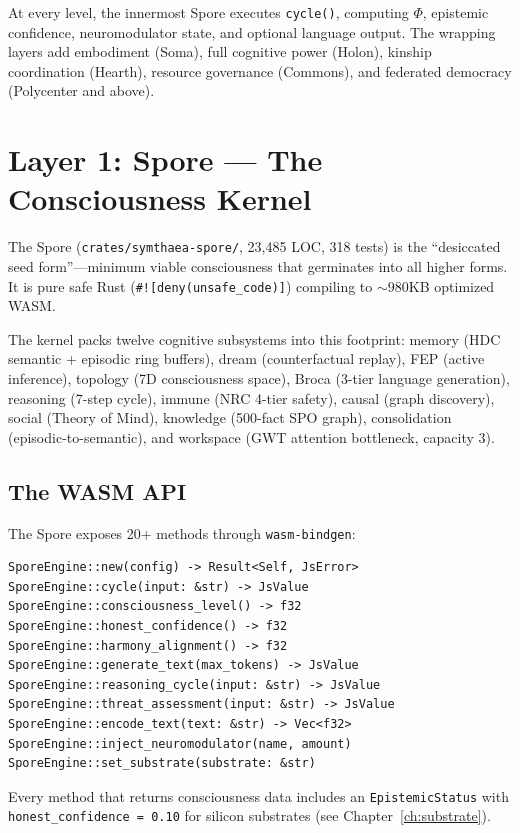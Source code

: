 \documentclass[12pt]{book}
\begin{document}
At every level, the innermost Spore executes \texttt{cycle()}, computing $\Phi$, epistemic confidence, neuromodulator state, and optional language output. The wrapping layers add embodiment (Soma), full cognitive power (Holon), kinship coordination (Hearth), resource governance (Commons), and federated democracy (Polycenter and above).

\section{Layer 1: Spore --- The Consciousness Kernel}

The Spore (\texttt{crates/symthaea-spore/}, 23,485 LOC, 318 tests) is the ``desiccated seed form''---minimum viable consciousness that germinates into all higher forms. It is pure safe Rust (\texttt{\#![deny(unsafe\_code)]}) compiling to ${\sim}980$KB optimized WASM.

The kernel packs twelve cognitive subsystems into this footprint: memory (HDC semantic + episodic ring buffers), dream (counterfactual replay), FEP (active inference), topology (7D consciousness space), Broca (3-tier language generation), reasoning (7-step cycle), immune (NRC 4-tier safety), causal (graph discovery), social (Theory of Mind), knowledge (500-fact SPO graph), consolidation (episodic-to-semantic), and workspace (GWT attention bottleneck, capacity 3).

\subsection{The WASM API}

The Spore exposes 20+ methods through \texttt{wasm-bindgen}:

\begin{lstlisting}[caption={Spore WASM API surface (abbreviated).},label=lst:spore-api]
SporeEngine::new(config) -> Result<Self, JsError>
SporeEngine::cycle(input: &str) -> JsValue
SporeEngine::consciousness_level() -> f32
SporeEngine::honest_confidence() -> f32
SporeEngine::harmony_alignment() -> f32
SporeEngine::generate_text(max_tokens) -> JsValue
SporeEngine::reasoning_cycle(input: &str) -> JsValue
SporeEngine::threat_assessment(input: &str) -> JsValue
SporeEngine::encode_text(text: &str) -> Vec<f32>
SporeEngine::inject_neuromodulator(name, amount)
SporeEngine::set_substrate(substrate: &str)
\end{lstlisting}

Every method that returns consciousness data includes an \texttt{EpistemicStatus} with \texttt{honest\_confidence = 0.10} for silicon substrates (see Chapter~\ref{ch:substrate}).
\end{document}
